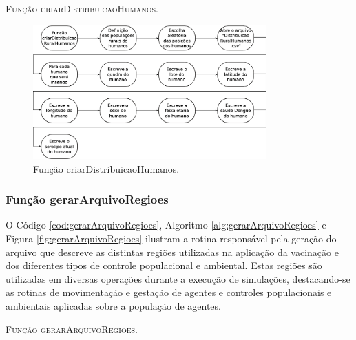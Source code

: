 

\begin{algorithm}[H]
   \SetAlgoLined   
   
   \caption{\textsc{Função criarDistribuicaoHumanos.}}
   \label{alg:criarDistribuicaoHumanos}
\end{algorithm}

\begin{figure}[H]
  \centering
  \includegraphics[width=0.8\textwidth]{Figuras/Simula/Fluxos/criarDistribuicaoHumanos.eps}
  \caption{Função criarDistribuicaoHumanos.}
  \label{fig:criarDistribuicaoHumanos}
\end{figure} 

\newpage

\subsubsection{Função gerarArquivoRegioes}

O Código \ref{cod:gerarArquivoRegioes}, Algoritmo \ref{alg:gerarArquivoRegioes} e Figura \ref{fig:gerarArquivoRegioes} ilustram a rotina responsável pela geração do arquivo que descreve as distintas regiões utilizadas na aplicação da vacinação e dos diferentes tipos de controle populacional e ambiental. Estas regiões são utilizadas em diversas operações durante a execução de simulações, destacando-se as rotinas de movimentação e gestação de agentes e controles populacionais e ambientais aplicadas sobre a população de agentes. 



\begin{algorithm}[H]
   \SetAlgoLined   
   
   \caption{\textsc{Função gerarArquivoRegioes.}}
   \label{alg:gerarArquivoRegioes}
\end{algorithm}

